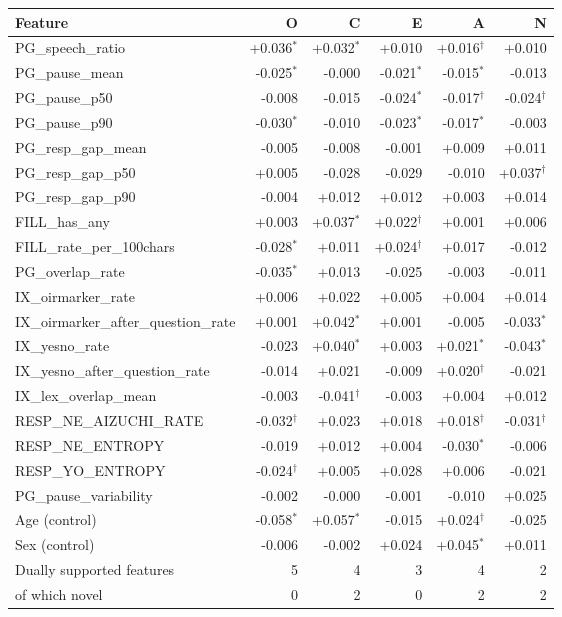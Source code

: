 \begingroup
\footnotesize
\setlength{\tabcolsep}{4pt}
\begin{tabular}{lrrrrr}
\toprule
Feature & O & C & E & A & N \\
\midrule
PG\_speech\_ratio & +0.036$^{*}$ & +0.032$^{*}$ & +0.010 & +0.016$^{\dagger}$ & +0.010 \\
PG\_pause\_mean & -0.025$^{*}$ & -0.000 & -0.021$^{*}$ & -0.015$^{*}$ & -0.013 \\
PG\_pause\_p50 & -0.008 & -0.015 & -0.024$^{*}$ & -0.017$^{\dagger}$ & -0.024$^{\dagger}$ \\
PG\_pause\_p90 & -0.030$^{*}$ & -0.010 & -0.023$^{*}$ & -0.017$^{*}$ & -0.003 \\
PG\_resp\_gap\_mean & -0.005 & -0.008 & -0.001 & +0.009 & +0.011 \\
PG\_resp\_gap\_p50 & +0.005 & -0.028 & -0.029 & -0.010 & +0.037$^{\dagger}$ \\
PG\_resp\_gap\_p90 & -0.004 & +0.012 & +0.012 & +0.003 & +0.014 \\
FILL\_has\_any & +0.003 & +0.037$^{*}$ & +0.022$^{\dagger}$ & +0.001 & +0.006 \\
FILL\_rate\_per\_100chars & -0.028$^{*}$ & +0.011 & +0.024$^{\dagger}$ & +0.017 & -0.012 \\
PG\_overlap\_rate & -0.035$^{*}$ & +0.013 & -0.025 & -0.003 & -0.011 \\
IX\_oirmarker\_rate & +0.006 & +0.022 & +0.005 & +0.004 & +0.014 \\
IX\_oirmarker\_after\_question\_rate & +0.001 & +0.042$^{*}$ & +0.001 & -0.005 & -0.033$^{*}$ \\
IX\_yesno\_rate & -0.023 & +0.040$^{*}$ & +0.003 & +0.021$^{*}$ & -0.043$^{*}$ \\
IX\_yesno\_after\_question\_rate & -0.014 & +0.021 & -0.009 & +0.020$^{\dagger}$ & -0.021 \\
IX\_lex\_overlap\_mean & -0.003 & -0.041$^{\dagger}$ & -0.003 & +0.004 & +0.012 \\
RESP\_NE\_AIZUCHI\_RATE & -0.032$^{\dagger}$ & +0.023 & +0.018 & +0.018$^{\dagger}$ & -0.031$^{\dagger}$ \\
RESP\_NE\_ENTROPY & -0.019 & +0.012 & +0.004 & -0.030$^{*}$ & -0.006 \\
RESP\_YO\_ENTROPY & -0.024$^{\dagger}$ & +0.005 & +0.028 & +0.006 & -0.021 \\
PG\_pause\_variability & -0.002 & -0.000 & -0.001 & -0.010 & +0.025 \\
\midrule
Age (control) & -0.058$^{*}$ & +0.057$^{*}$ & -0.015 & +0.024$^{\dagger}$ & -0.025 \\
Sex (control) & -0.006 & -0.002 & +0.024 & +0.045$^{*}$ & +0.011 \\
\midrule
Dually supported features & 5 & 4 & 3 & 4 & 2 \\
\quad of which novel & 0 & 2 & 0 & 2 & 2 \\
\bottomrule
\end{tabular}
\endgroup
